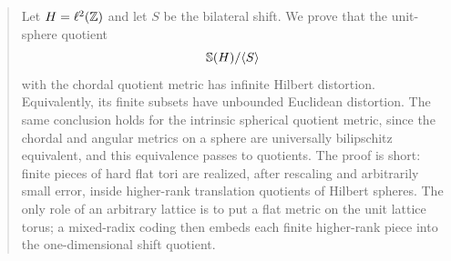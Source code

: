 \begin{abstract}
Let $H=\ell^2(\Z)$ and let $S$ be the bilateral shift.  We prove that the unit-sphere quotient
\[
        \Sphere(H)/\langle S\rangle
\]
with the chordal quotient metric has infinite Hilbert distortion.  Equivalently,
its finite subsets have unbounded Euclidean distortion.  The same conclusion
holds for the intrinsic spherical quotient metric, since the chordal and angular
metrics on a sphere are universally bilipschitz equivalent, and this equivalence
passes to quotients.  The proof is short: finite pieces of hard flat tori are
realized, after rescaling and arbitrarily small error, inside higher-rank
translation quotients of Hilbert spheres.  The only role of an arbitrary lattice
is to put a flat metric on the unit lattice torus; a mixed-radix coding then
embeds each finite higher-rank piece into the one-dimensional shift quotient.
\end{abstract}